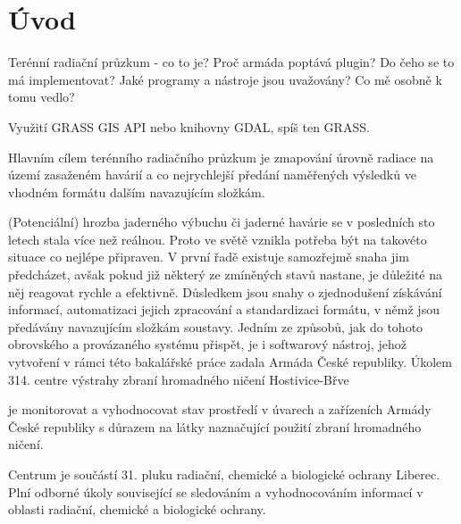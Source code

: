\chapter{Úvod}
\label{1-uvod}

Terénní radiační průzkum - co to je?
Proč armáda poptává plugin?
Do čeho se to má implementovat?
Jaké programy a nástroje jsou uvažovány?
Co mě osobně k tomu vedlo?

Využití GRASS GIS API nebo knihovny GDAL, spíš ten GRASS. 

Hlavním cílem terénního radiačního průzkum je zmapování úrovně radiace na území zasaženém havárií a co nejrychlejší předání naměřených výsledků ve vhodném formátu dalším navazujícím složkám. 


(Potenciální) hrozba jaderného výbuchu či jaderné havárie se v posledních sto letech stala více než reálnou. Proto ve světě vznikla potřeba být na takovéto situace co nejlépe připraven. V první řadě existuje samozřejmě snaha jim předcházet, avšak pokud již některý ze zmíněných stavů nastane, je důležité na něj reagovat rychle a efektivně. 
Důsledkem jsou snahy o zjednodušení získávání informací, automatizaci jejich zpracování a standardizaci formátu, v němž jsou předávány navazujícím složkám soustavy. Jedním ze způsobů, jak do tohoto obrovského a provázaného systému přispět, je i softwarový nástroj, jehož vytvoření v rámci této bakalářské práce zadala Armáda České republiky.
Úkolem 314. centre výstrahy zbraní hromadného ničení Hostivice-Břve 


je monitorovat a vyhodnocovat stav prostředí v úvarech a zařízeních Armády České republiky s důrazem na látky naznačující použití zbraní hromadného ničení.

Centrum je součástí 31. pluku radiační, chemické a biologické ochrany Liberec. Plní odborné úkoly související se sledováním a vyhodnocováním informací v oblasti radiační, chemické a biologické ochrany. 
